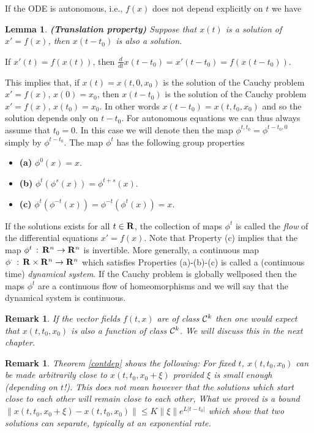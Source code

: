 \documentclass[12pt]{report}
\newcommand{\calC}{{\cal C}}
\newcommand{\bR}{{\bf R}}
\newtheorem{lemma}[theorem]{Lemma}
\newtheorem{remark}[theorem]{Remark}
\newcommand{\proof}{\noindent {\em Proof:~}}
\def\qed{\hbox{\hskip 6pt\vrule width6pt height7pt depth1pt
    \hskip1pt}\bigskip}
\def\to{\rightarrow}
\begin{document}
If the ODE is autonomous, i.e., $f(x)$ does not depend
explicitly on $t$ we have 

\begin{lemma}{\bf (Translation property)} Suppose that $x(t)$ is a solution 
of $x'=f(x)$, then $x(t-t_0)$ is also a solution.
\end{lemma}

\proof If $x'(t)= f(x(t))$, then $\frac{d}{dt} x(t -t_0) = x'(t-t_0) = 
f(x(t-t_0))$. \hfill \qed 

This implies that, if $x(t)=x(t,0,x_0)$ is the solution of the Cauchy
problem $x'=f(x)$, $x(0)=x_0$, then $x(t-t_0)$ is the solution of the
Cauchy problem $x'=f(x)$, $x(t_0)=x_0$. In other words $x(t-t_0) =
x(t, t_0, x_0)$ and so the solution depends only on $t-t_0$. 
For autonomous equations we can thus always assume that $t_0=0$.  
In this case we will denote then the map
$\phi^{t,t_0}=\phi^{t-t_0,0}$ simply by $\phi^{t -t_0}$. The map
$\phi^t$ has the following group properties
\begin{itemize}
\item{\bf (a)} $\phi^0(x) = x$. 
\item{\bf (b)} $\phi^t (\phi^s(x)) = \phi^{t+s}(x)$.
\item{\bf (c)} $\phi^t ( \phi^{-t}(x)) = \phi^{-t}(  \phi^t (x))= x $.
\end{itemize}
If the solutions exists for all $t \in \bR$, the collection of maps
$\phi^t$ is called the {\em flow} of the differential equations $x' =
f(x)$. Note that Property (c) implies that the map $\phi^t \,:\, \bR^n
\to \bR^n$ is invertible.  More generally, a continuous map $\phi^{\cdot} \,:\,
\bR \times \bR^n \to \bR^n$ which satisfies Properties (a)-(b)-(c) is
called a (continuous time) {\em dynamical system}.  If the Cauchy 
problem is globally wellposed then the maps $\phi^t$ are a continuous 
flow of homeomorphisms and we will say that the dynamical system is continuous. 


\begin{remark}{\rm  If the vector fields $f(t,x)$ are of class $\calC^k$ then 
one would expect that $x(t,t_0,x_0)$ is also a function of class $\calC^k$. 
We will discuss this in the next chapter. 
}
\end{remark}

\begin{remark}{\rm Theorem \ref{contdep} shows the following: For fixed  
$t$, $x(t,t_0,x_0)$ can be made arbitrarily close to
$x(t,t_0,x_0+\xi)$ provided $\xi$ is small enough (depending on
$t$!). This does not mean however that the solutions which start close
to each other will remain close to each other, What we proved is a
bound $\|x(t,t_0,x_0+\xi) - x(t,t_0,x_0)\| \le K \|\xi\| e^{L|t-t_0|}$
which show that two solutions can separate, typically at an exponential rate.
}
\end{remark}
\end{document}
